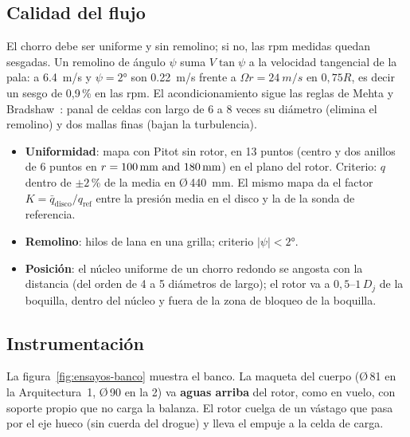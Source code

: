 \subsection{Calidad del flujo}
El chorro debe ser uniforme y sin remolino; si no, las rpm medidas quedan sesgadas. Un
remolino de ángulo $\psi$ suma $V\tan\psi$ a la velocidad tangencial de la pala: a
\SI{6.4}{m/s} y $\psi=\ang{2}$ son \SI{0.22}{m/s} frente a $\Omega r=\SI{24}{m/s}$ en
$0{,}75R$, es decir un sesgo de 0,9\,\% en las rpm. El acondicionamiento sigue las
reglas de Mehta y Bradshaw~\cite{ensayos-mehta1979}: panal de celdas con largo de 6 a 8
veces su diámetro (elimina el remolino) y dos mallas finas (bajan la turbulencia).
\begin{itemize}
  \item \textbf{Uniformidad}: mapa con Pitot sin rotor, en 13 puntos (centro y dos anillos
        de 6 puntos en $r=\SIlist{100;180}{mm}$) en el plano del rotor. Criterio: $q$ dentro
        de $\pm2$\,\% de la media en Ø\,\SI{440}{mm}. El mismo mapa da el factor
        $K=\bar q_\text{disco}/q_\text{ref}$ entre la presión media en el disco y la de la
        sonda de referencia.
  \item \textbf{Remolino}: hilos de lana en una grilla; criterio $|\psi|<\ang{2}$.
  \item \textbf{Posición}: el núcleo uniforme de un chorro redondo se angosta con la
        distancia (del orden de 4 a 5 diámetros de largo); el rotor va a
        $0{,}5$--$1\,D_j$ de la boquilla, dentro del núcleo y fuera de la zona de bloqueo
        de la boquilla.
\end{itemize}

\subsection{Instrumentación}
La figura~\ref{fig:ensayos-banco} muestra el banco. La maqueta del cuerpo (Ø\,81 en la Arquitectura~1, Ø\,90 en la 2) va
\textbf{aguas arriba} del rotor, como en vuelo, con soporte propio que no carga la
balanza. El rotor cuelga de un vástago que pasa por el eje hueco (sin cuerda del drogue) y lleva el
empuje a la celda de carga.

